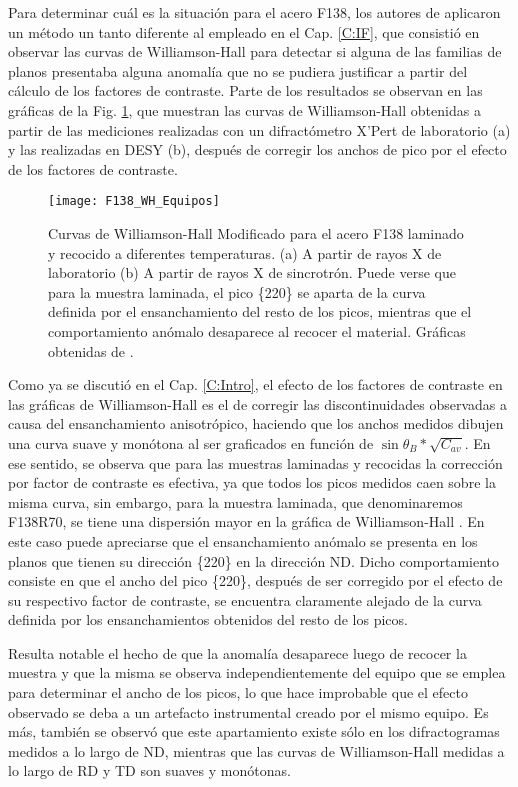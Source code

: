 Para determinar cuál es la situación para el acero F138, los autores de \cite{Devincentis2017} aplicaron un método un tanto diferente al empleado en el Cap. \ref{C:IF}, que consistió en observar las curvas de Williamson-Hall para detectar si alguna de las familias de planos presentaba alguna anomalía que no se pudiera justificar a partir del cálculo de los factores de contraste.
Parte de los resultados se observan en las gráficas de la Fig. \ref{fig:F138NatiWHvsEquipos}, que muestran las curvas de Williamson-Hall obtenidas a partir de las mediciones realizadas con un difractómetro X'Pert de laboratorio (a)  y las realizadas en DESY (b), después de corregir los anchos de pico por el efecto de los factores de contraste.

\begin{figure}[!htb]
  \centering
  \texttt{[image: F138\_WH\_Equipos]}
  \caption{Curvas de Williamson-Hall Modificado para el acero F138 laminado y recocido a diferentes temperaturas. (a) A partir de rayos X de laboratorio (b) A partir de rayos X de sincrotrón. Puede verse que para la muestra laminada, el pico \{220\} se aparta de la curva definida por el ensanchamiento del resto de los picos, mientras que el comportamiento anómalo desaparece al recocer el material. Gráficas obtenidas de \cite{Devincentis2017}.}
  \label{fig:F138NatiWHvsEquipos}
\end{figure}

Como ya se discutió en el Cap. \ref{C:Intro}, el efecto de los factores de contraste en las gráficas de Williamson-Hall es el de corregir las discontinuidades observadas a causa del ensanchamiento anisotrópico, haciendo que los anchos medidos dibujen una curva suave y monótona al ser graficados en función de $\sin{\theta_B}*\sqrt{C_{av}}$.
En ese sentido, se observa que para las muestras laminadas y recocidas la corrección por factor de contraste es efectiva, ya que todos los picos medidos caen sobre la misma curva, sin embargo, para la muestra laminada, que denominaremos F138R70, se tiene una dispersión mayor en la gráfica de Williamson-Hall .
En este caso puede apreciarse que el ensanchamiento anómalo se presenta en los planos que tienen su dirección \{220\} en la dirección ND.
Dicho comportamiento consiste en que el ancho del pico \{220\}, después de ser corregido por el efecto de su respectivo factor de contraste, se encuentra claramente alejado de la curva definida por los ensanchamientos obtenidos del resto de los picos.

Resulta notable el hecho de que la anomalía desaparece luego de recocer la muestra y que la misma se observa independientemente del equipo que se emplea para determinar el ancho de los picos, lo que hace improbable que el efecto observado se deba a un artefacto instrumental creado por el mismo equipo.
Es más, también se observó que este apartamiento existe sólo en los difractogramas medidos a lo largo de ND, mientras que las curvas de Williamson-Hall medidas a lo largo de RD y TD son suaves y monótonas.

